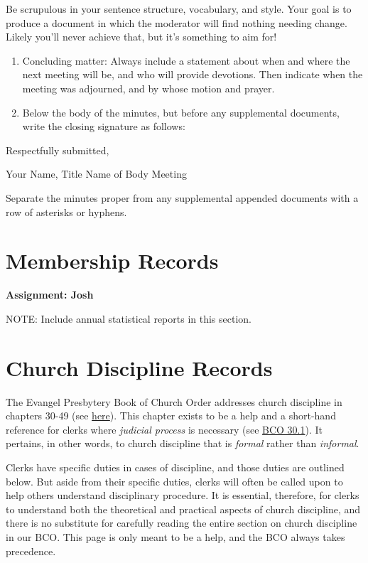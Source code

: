 \documentclass[
]{book}
\begin{document}
Be scrupulous in your sentence structure, vocabulary, and style. Your goal is to produce a document in which the moderator will find nothing needing change. Likely you'll never achieve that, but it's something to aim for!

\begin{enumerate}
\def\labelenumi{\arabic{enumi}.}
\setcounter{enumi}{16}
\item
  Concluding matter: Always include a statement about when and where the next meeting will be, and who will provide devotions. Then indicate when the meeting was adjourned, and by whose motion and prayer.
\item
  Below the body of the minutes, but before any supplemental documents, write the closing signature as follows:
\end{enumerate}

Respectfully submitted,

Your Name, Title
Name of Body Meeting

Separate the minutes proper from any supplemental appended documents with a row of asterisks or hyphens.

\hypertarget{membership-records}{%
\chapter{Membership Records}\label{membership-records}}

\textbf{Assignment: Josh}

NOTE: Include annual statistical reports in this section.

\hypertarget{church-discipline-records}{%
\chapter{Church Discipline Records}\label{church-discipline-records}}

The Evangel Presbytery Book of Church Order addresses church discipline in chapters 30-49 (see \href{https://evangel.pressbooks.com/chapter/30-discipline-its-nature-subjects-and-ends/}{here}). This chapter exists to be a help and a short-hand reference for clerks where \emph{judicial process} is necessary (see \href{https://evangel.pressbooks.com/chapter/30-discipline-its-nature-subjects-and-ends/}{BCO 30.1}). It pertains, in other words, to church discipline that is \emph{formal} rather than \emph{informal}.

Clerks have specific duties in cases of discipline, and those duties are outlined below. But aside from their specific duties, clerks will often be called upon to help others understand disciplinary procedure. It is essential, therefore, for clerks to understand both the theoretical and practical aspects of church discipline, and there is no substitute for carefully reading the entire section on church discipline in our BCO. This page is only meant to be a help, and the BCO always takes precedence.
\end{document}
